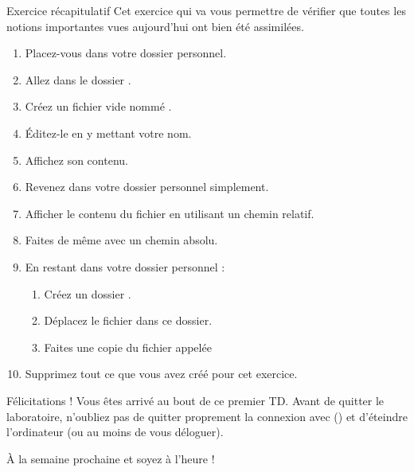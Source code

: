 \documentclass[a4paper,11pt]{style-esi/td}
\begin{document}
	\begin{Exercice}{Exercice récapitulatif}
		Cet exercice qui va vous permettre de vérifier
		que toutes les notions importantes vues aujourd'hui
		ont bien été assimilées.
		\begin{enumerate}
			\item Placez-vous dans votre dossier personnel.
			\item Allez dans le dossier .
			\item Créez un fichier vide nommé .
			\item Éditez-le en y mettant votre nom.
			\item Affichez son contenu.
			\item Revenez dans votre dossier personnel simplement.
			\item Afficher le contenu du fichier 
				en utilisant un chemin relatif.
			\item Faites de même avec un chemin absolu.
			\item En restant dans votre dossier personnel :
			\begin{enumerate}
				\item Créez un dossier .
				\item Déplacez le fichier  dans ce dossier.
				\item Faites une copie du fichier 
					appelée 
			\end{enumerate}
			\item Supprimez tout ce que vous avez créé pour cet exercice.
		\end{enumerate}
	\end{Exercice}

	\bigskip
	\begin{infotbox}{Félicitations !} 
		Vous êtes arrivé au bout de ce premier TD.
		Avant de quitter le laboratoire, n'oubliez pas de quitter proprement 
		la connexion avec  () 
		et d'éteindre l'ordinateur (ou au moins de vous déloguer).

		À la semaine prochaine et soyez à l'heure !
	\end{infotbox}
\end{document}
